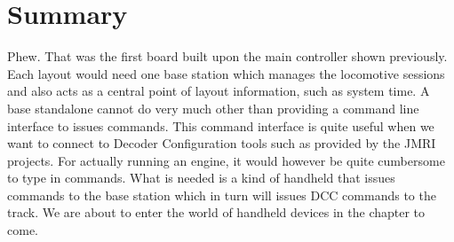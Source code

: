 
\section{Summary}

Phew. That was the first board built upon the main controller shown previously. Each layout would need one base station which manages the locomotive sessions and also acts as a central point of layout information, such as system time. A base standalone cannot do very much other than providing a command line interface to issues commands. This command interface is quite useful when we want to connect to Decoder Configuration tools such as provided by the JMRI projects. For actually running an engine, it would however be quite cumbersome to type in commands. What is needed is a kind of handheld that issues commands to the base station which in turn will issues DCC commands to the track. We are about to enter the world of handheld devices in the chapter to come.
